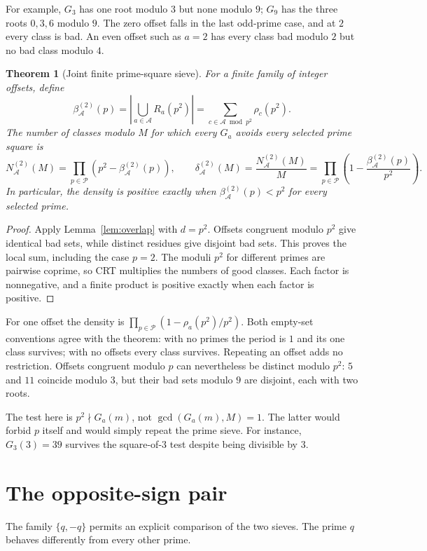 \documentclass[11pt]{article}
\newtheorem{theorem}{Theorem}[section]
\theoremstyle{definition}
\theoremstyle{remark}
\newcommand{\Pset}{\mathcal P}
\begin{document}
For example, $G_3$ has one root modulo $3$ but none modulo $9$;
$G_9$ has the three roots $0,3,6$ modulo $9$.
The zero offset falls in the last odd-prime case, and at $2$ every
class is bad. An even offset such as $a=2$ has every class bad
modulo $2$ but no bad class modulo $4$.

\begin{theorem}[Joint finite prime-square sieve]\label{thm:square-sieve}
For a finite family of integer offsets, define
\[
 \beta^{(2)}_{\mathcal A}(p)
 =\left|\bigcup_{a\in\mathcal A}R_a(p^2)\right|
 =\sum_{c\in\mathcal A\bmod p^2}\rho_c(p^2).
\]
The number of classes modulo $M$ for which every $G_a$ avoids
every selected prime square is
\[
 N^{(2)}_{\mathcal A}(M)
 =\prod_{p\in\Pset}(p^2-\beta^{(2)}_{\mathcal A}(p)),
 \qquad
 \delta^{(2)}_{\mathcal A}(M)
 =\frac{N^{(2)}_{\mathcal A}(M)}M
 =\prod_{p\in\Pset}\left(1-\frac{\beta^{(2)}_{\mathcal A}(p)}{p^2}\right).
\]
In particular, the density is positive exactly when
$\beta^{(2)}_{\mathcal A}(p)<p^2$ for every selected prime.
\end{theorem}
\begin{proof}
Apply Lemma~\ref{lem:overlap} with $d=p^2$. Offsets congruent modulo
$p^2$ give identical bad sets, while distinct residues give disjoint
bad sets. This proves the local sum, including the case $p=2$.
The moduli $p^2$ for different primes are pairwise coprime,
so CRT multiplies the numbers of good classes. Each factor is
nonnegative, and a finite product is positive exactly when each
factor is positive.
\end{proof}

For one offset the density is $\prod_{p\in\Pset}(1-\rho_a(p^2)/p^2)$.
Both empty-set conventions agree with the theorem: with no primes
the period is $1$ and its one class survives; with no offsets every
class survives. Repeating an offset adds no restriction. Offsets
congruent modulo $p$ can nevertheless be distinct modulo $p^2$:
$5$ and $11$ coincide modulo $3$, but their bad sets modulo $9$
are disjoint, each with two roots.

The test here is $p^2\nmid G_a(m)$, not
$\gcd(G_a(m),M)=1$. The latter would forbid $p$ itself and would
simply repeat the prime sieve. For instance, $G_3(3)=39$ survives
the square-of-$3$ test despite being divisible by $3$.

\section{The opposite-sign pair}
The family $\{q,-q\}$ permits an explicit comparison of the two sieves.
The prime $q$ behaves differently from every other prime.
\end{document}
